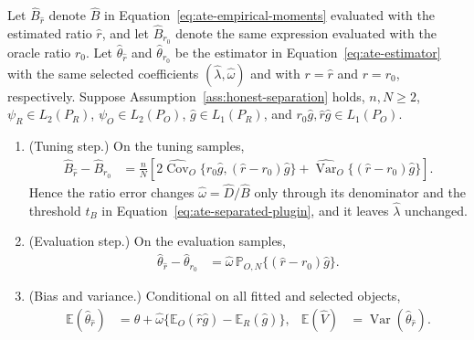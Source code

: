 \begin{proposition}
\label{prop:estimated-ratio-effect}
Let $\widehat B_{\widehat r}$ denote $\widehat B$ in Equation~\eqref{eq:ate-empirical-moments} evaluated with the estimated ratio $\widehat r$, and let $\widehat B_{r_0}$ denote the same expression evaluated with the oracle ratio $r_0$. Let $\widehat\theta_{\widehat r}$ and $\widehat\theta_{r_0}$ be the estimator in Equation~\eqref{eq:ate-estimator} with the same selected coefficients $(\widehat\lambda,\widehat\omega)$ and with $r=\widehat r$ and $r=r_0$, respectively. Suppose Assumption~\ref{ass:honest-separation} holds, $n,N\geq2$, $\psi_R\in L_2(P_R)$, $\psi_O\in L_2(P_O)$, $\widehat g\in L_1(P_R)$, and $r_0\widehat g,\widehat r\widehat g\in L_1(P_O)$.
\begin{enumerate}
\item (Tuning step.) On the tuning samples,
\begin{align}
\widehat B_{\widehat r}-\widehat B_{r_0}
&=\frac nN\left[
2\widehat{\operatorname{Cov}}_O\{r_0\widehat g,(\widehat r-r_0)\widehat g\}
+\widehat{\operatorname{Var}}_O\{(\widehat r-r_0)\widehat g\}
\right].
\label{eq:ratio-B-error}
\end{align}
Hence the ratio error changes $\widehat\omega=\widehat D/\widehat B$ only through its denominator and the threshold $t_B$ in Equation~\eqref{eq:ate-separated-plugin}, and it leaves $\widehat\lambda$ unchanged.
\item (Evaluation step.) On the evaluation samples,
\begin{align}
\widehat\theta_{\widehat r}-\widehat\theta_{r_0}
&=\widehat\omega\,\mathbb P_{O,N}\{(\widehat r-r_0)\widehat g\}.
\label{eq:estimated-ratio-difference}
\end{align}
\item (Bias and variance.) Conditional on all fitted and selected objects,
\begin{align}
\mathbb E(\widehat\theta_{\widehat r})
&=\theta+\widehat\omega\{\mathbb E_O(\widehat r\widehat g)-\mathbb E_R(\widehat g)\},
&
\mathbb E(\widehat V)&=\operatorname{Var}(\widehat\theta_{\widehat r}).
\label{eq:estimated-ratio-conditional-identities}
\end{align}
\end{enumerate}
\end{proposition}

